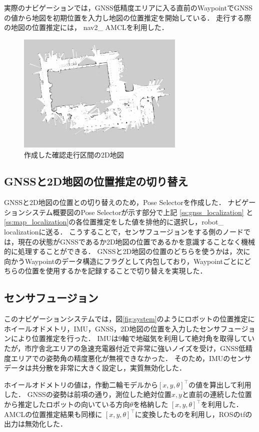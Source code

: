 \documentclass[platex,dvipdfmx]{rbproceedings}
\begin{document}
実際のナビゲーションでは，GNSS低精度エリアに入る直前のWaypointでGNSSの値から地図を初期位置を入力し地図の位置推定を開始している．
走行する際の地図の位置推定には， nav2\_ AMCL\cite{nav2}を利用した．
\begin{figure}[htbp]
    \centering   
    \includegraphics[keepaspectratio,width=80mm]{fig/map.png}
    \caption{作成した確認走行区間の2D地図}
    \label{fig:map}
\end{figure}

\subsection{GNSSと2D地図の位置推定の切り替え}
GNSSと2D地図の位置との切り替えのため，Pose Selectorを作成した．
ナビゲーションシステム概要図のPose Selectorが示す部分で上記 \ref{ss:gnss_localization} と  \ref{ss:map_localization}の各位置推定をした値を排他的に選択し，robot\_ localizationに送る．
こうすることで，センサフュージョンをする側のノードでは，現在の状態がGNSSであるか2D地図の位置であるかを意識することなく機械的に処理することができる．
GNSSと2D地図の位置のどちらを使うかは，次に向かうWaypointのデータ構造にフラグとして内包しており，Waypointごとにどちらの位置を使用するかを記録することで切り替えを実現した．


\subsection{センサフュージョン}\label{ss:sensor_fusion}
このナビゲーションシステムでは，図\ref{fig:system}のようにロボットの位置推定にホイールオドメトリ，IMU，GNSS，2D地図の位置を入力したセンサフュージョンにより位置推定を行った．
IMUは9軸で地磁気を利用して絶対角を取得していたが，市庁舎北エリアの急速充電器付近で非常に強いノイズを受け，GNSS低精度エリアでの姿勢角の精度悪化が無視できなかった．
そのため，IMUのセンサデータは共分散を非常に大きく設定し，実質無効化した．

ホイールオドメトリの値は，作動二輪モデルから$\left[ x, y, \theta \right] ^\top$の値を算出して利用した．
GNSSの姿勢は前項の通り，測位した絶対位置$x, y$と直前の連続した位置から推定したロボットの向いている方向$\theta$を格納した $\left[ x, y, \theta \right] ^\top$を利用した．
AMCLの位置推定結果も同様に $\left[ x, y, \theta \right] ^\top$に変換したものを利用し，ROSのtfの出力は無効化した．
\end{document}
